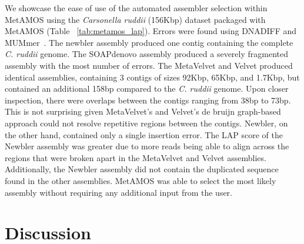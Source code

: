 \documentclass[conference]{IEEEtran}
\begin{document}
We showcase the ease of use of the automated assembler selection within MetAMOS using the \emph{Carsonella ruddii} (156Kbp) dataset packaged with MetAMOS (Table ~\ref{tab:metamos_lap}).
Errors were found using DNADIFF and MUMmer~\cite{delcher2003using}.
The newbler assembly produced one contig containing the complete \emph{C. ruddii} genome.
The SOAPdenovo assembly produced a severely fragmented assembly with the most number of errors.
The MetaVelvet and Velvet produced identical assemblies, containing 3 contigs of sizes 92Kbp, 65Kbp, and 1.7Kbp, but contained an additional 158bp compared to the \emph{C. ruddii} genome.
Upon closer inspection, there were overlaps between the contigs ranging from 38bp to 73bp.
This is not surprising given MetaVelvet's and Velvet's de bruijn graph-based approach could not resolve repetitive regions between the contigs.
Newbler, on the other hand, contained only a single insertion error.
The LAP score of the Newbler assembly was greater due to more reads being able to align across the regions that were broken apart in the MetaVelvet and Velvet assemblies.
Additionally, the Newbler assembly did not contain the duplicated sequence found in the other assemblies.
MetAMOS was able to select the most likely assembly without requiring any additional input from the user.

\section{Discussion}
\end{document}
